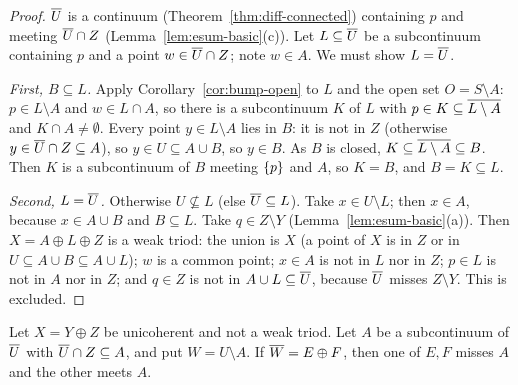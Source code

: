 \begin{proof}
$\overline{U}$ is a continuum (Theorem~\ref{thm:diff-connected}) containing $p$ and meeting $\overline{U}\cap Z$
(Lemma~\ref{lem:esum-basic}(c)). Let $L\subseteq\overline{U}$ be a subcontinuum containing $p$ and a point
$w\in\overline{U}\cap Z$; note $w\in A$. We must show $L=\overline{U}$.

\emph{First, $B\subseteq L$.} Apply Corollary~\ref{cor:bump-open} to $L$ and the open set $O=S\setminus
A$: $p\in L\setminus A$ and $w\in L\cap A$, so there is a subcontinuum $K$ of $L$ with $p\in
K\subseteq\overline{L\setminus A}$ and $K\cap A\ne\emptyset$. Every point $y\in L\setminus A$ lies in $B$: it
is not in $Z$ (otherwise $y\in\overline{U}\cap Z\subseteq A$), so $y\in U\subseteq A\cup B$, so $y\in B$. As $B$ is
closed, $K\subseteq\overline{L\setminus A}\subseteq B$. Then $K$ is a subcontinuum of $B$ meeting $\left\{ p \right\}$ and
$A$, so $K=B$, and $B=K\subseteq L$.

\emph{Second, $L=\overline{U}$.} Otherwise $U\not\subseteq L$ (else $\overline{U}\subseteq L$). Take $x\in U\setminus L$;
then $x\in A$, because $x\in A\cup B$ and $B\subseteq L$. Take $q\in Z\setminus Y$
(Lemma~\ref{lem:esum-basic}(a)). Then $X=A\oplus L\oplus Z$ is a weak triod: the union is $X$ (a point
of $X$ is in $Z$ or in $U\subseteq A\cup B\subseteq A\cup L$); $w$ is a common point; $x\in A$ is not in
$L$ nor in $Z$; $p\in L$ is not in $A$ nor in $Z$; and $q\in Z$ is not in $A\cup L\subseteq\overline{U}$, because
$\overline{U}$ misses $Z\setminus Y$. This is excluded.
\end{proof}


\begin{proposition}\label{prop:1132}
Let $X=Y\oplus Z$ be unicoherent and not a weak triod. Let $A$ be a subcontinuum of $\overline{U}$ with
$\overline{U}\cap Z\subseteq A$, and put $W=U\setminus A$. If $\overline{W}=E\oplus F$, then one of $E,F$ misses $A$
and the other meets $A$.
\end{proposition}

